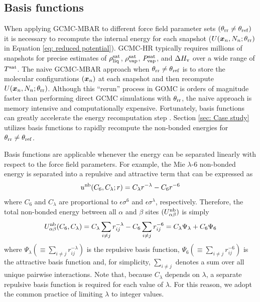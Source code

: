 \documentclass[journal=jced,manuscript=article]{achemso}
\newcommand{\bfv}[1]{{\mbox{\boldmath{$#1$}}}}
\newcommand{\x}{\bfv{x}}
\begin{document}
\subsection{Basis functions} \label{sec: Basis functions}

When applying GCMC-MBAR to different force field parameter sets $(\theta_{\rm rr} \neq \theta_{\rm ref})$ it is necessary to recompute the internal energy for each snapshot ($U(\x_{n},N_n;\theta_{\rm rr})$ in Equation \ref{eq: reduced potential}). GCMC-HR typically requires millions of snapshots for precise estimates of $\rho_{\rm liq}^{\rm sat}$, $\rho_{\rm vap}^{\rm sat}$, $P_{\rm vap}^{\rm sat}$, and $\Delta H_{\rm v}$ over a wide range of $T^{\rm sat}$. The naive GCMC-MBAR approach when $\theta_{\rm rr} \neq \theta_{\rm ref}$ is to store the molecular configurations $(\x_{n})$ at each snapshot and then recompute $U(\x_{n},N_n;\theta_{\rm rr})$. Although this ``rerun'' process in GOMC is orders of magnitude faster than performing direct GCMC simulations with $\theta_{\rm rr}$, the naive approach is memory intensive and computationally expensive. Fortunately, basis functions can greatly accelerate the energy recomputation step \cite{naden:jctc:2016,Postdoc_1}. Section \ref{sec: Case study} utilizes basis functions to rapidly recompute the non-bonded energies for $\theta_{\rm rr} \neq \theta_{\rm ref}$.

Basis functions are applicable whenever the energy can be separated linearly with respect to the force field parameters. For example, the Mie $\lambda$-6 non-bonded energy is separated into a repulsive and attractive term that can be expressed as
\begin{equation} \label{Mie basis function}
u^{\rm nb}(C_6,C_\lambda;r) = C_\lambda r^{-\lambda} - C_6 r^{-6}
\end{equation} 
where $C_6$ and $C_\lambda$ are proportional to $\epsilon \sigma^6$ and $\epsilon \sigma^\lambda$, respectively. Therefore, the total non-bonded energy between all $\alpha$ and $\beta$ sites $(U_{\alpha\beta}^{\rm nb})$ is simply
\begin{equation} \label{Utotal basis function}
U_{\alpha\beta}^{\rm nb}(C_6,C_\lambda) = C_\lambda \sum_{i \neq j} r_{ij}^{-\lambda} - C_6 \sum_{i \neq j} r_{ij}^{-6} = C_\lambda \Psi_{\lambda} + C_6 \Psi_{6}
\end{equation}
where $\Psi_{\lambda} (\equiv \sum_{i \neq j} r_{ij}^{-\lambda})$ is the repulsive basis function, $\Psi_{6} (\equiv \sum_{i \neq j} r_{ij}^{-6})$ is the attractive basis function and, for simplicity, $\sum_{i \neq j}$ denotes a sum over all unique pairwise interactions. Note that, because $C_\lambda$ depends on $\lambda$, a separate repulsive basis function is required for each value of $\lambda$. For this reason, we adopt the common practice of limiting $\lambda$ to integer values.
\end{document}
